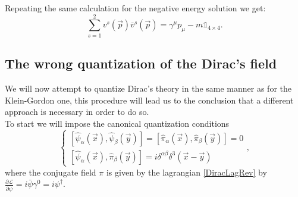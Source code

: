 Repeating the same calculation for the negative energy solution we get:
\begin{equation*}
    \sum_{s=1}^{2}v^{s}(\vec p)\bar{v}^s(\vec p)=\gamma^{\mu}p_{\mu}-m\mathds{1}_{4\times4}.
\end{equation*}
\subsection{The wrong quantization of the Dirac's field}
We will now attempt to quantize Dirac's theory in the same manner as for the Klein-Gordon one, this procedure will lead us to the conclusion that a different approach is necessary in order to do so.\\

To start we will impose the canonical quantization conditions
\begin{equation*}
    \begin{cases}
        [\hat{\psi}_\alpha(\vec x),\hat{\psi}_\beta(\vec y)]=[\hat{\pi}_\alpha(\vec x),\hat{\pi}_\beta(\vec y)]=0\\
        [\hat{\psi}_\alpha(\vec x),\hat{\pi}_\beta(\vec y)]=i\delta^{\alpha\beta}\delta^3(\vec x-\vec y)
    \end{cases},
\end{equation*}
where the conjugate field $\pi$ is given by the lagrangian \eqref{DiracLagRev} by $\frac{\partial\mathcal{L} }{\partial \dot\psi}=i\bar\psi\gamma^0=i\psi^{\dagger}$. \\

